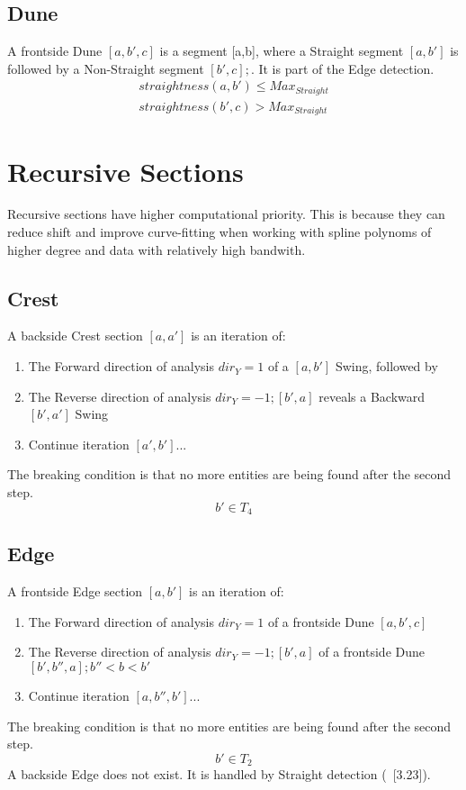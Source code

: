 \documentclass{report}
\begin{document}
\subsection{Dune}
A frontside Dune $[a,b',c]$ is a segment [a,b], where a Straight segment $[a,b']$ is followed by a Non-Straight segment $[b',c]; $. It is part of the Edge detection.
\begin{align}
straightness(a,b')\leq Max_{Straight}\\ straightness(b',c)> Max_{Straight}
\end{align}

\section{Recursive Sections}
Recursive sections have higher computational priority. This is because they can reduce shift and improve curve-fitting when working with spline polynoms of higher degree and data with relatively high bandwith.

\subsection{Crest}
A backside Crest section $[a,a']$ is an iteration of:
\begin{enumerate}
\item The Forward direction of analysis $dir_{Y}=1$ of a $[a,b']$ Swing, followed by 
\item The Reverse direction of analysis $dir_{Y}=-1;[b',a]$ reveals a Backward $[b',a']$ Swing
\item Continue iteration $[a',b']...$
\end{enumerate}
The breaking condition is that no more entities are being found after the second step.
\begin{equation}
b' \in T_{4}
\end{equation}

\subsection{Edge}
A frontside Edge section $[a,b']$ is an iteration of:
\begin{enumerate}
\item The Forward direction of analysis $dir_{Y}=1$ of a frontside Dune $[a,b',c]$
\item The Reverse direction of analysis $dir_{Y}=-1;[b',a]$ of a frontside Dune $[b',b'',a]; b''<b<b'$ 
\item Continue iteration $[a,b'',b']...$
\end{enumerate}
The breaking condition is that no more entities are being found after the second step.
\begin{equation}
b' \in T_{2}
\end{equation}
A backside Edge does not exist. It is handled by Straight detection (~\cite{Analyzer}[3.23]).
\end{document}
